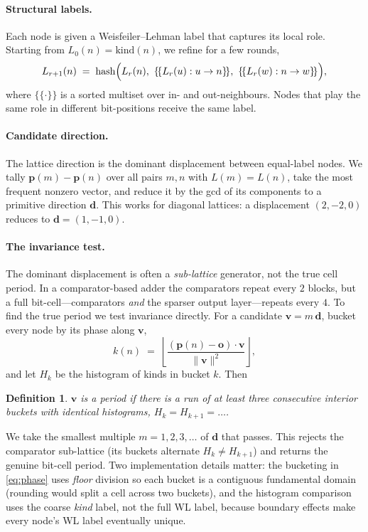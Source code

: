 \documentclass[11pt]{article}
\newtheorem{definition}{Definition}
\newcommand{\vv}{\mathbf{v}}
\newcommand{\pp}{\mathbf{p}}
\newcommand{\oo}{\mathbf{o}}
\begin{document}
\paragraph{Structural labels.} Each node is given a Weisfeiler--Lehman label that
captures its local role. Starting from $L_0(n)=\mathrm{kind}(n)$, we refine for a
few rounds,
\[
L_{r+1}(n) \;=\; \mathrm{hash}\Bigl(L_r(n),\ \{\!\{L_r(u) : u\to n\}\!\},\
\{\!\{L_r(w) : n\to w\}\!\}\Bigr),
\]
where $\{\!\{\cdot\}\!\}$ is a sorted multiset over in- and out-neighbours. Nodes
that play the same role in different bit-positions receive the same label.

\paragraph{Candidate direction.} The lattice direction is the dominant
displacement between equal-label nodes. We tally
$\pp(m)-\pp(n)$ over all pairs $m,n$ with $L(m)=L(n)$, take the most frequent
nonzero vector, and reduce it by the gcd of its components to a primitive
direction $\mathbf{d}$. This works for diagonal lattices: a displacement
$(2,-2,0)$ reduces to $\mathbf{d}=(1,-1,0)$.

\paragraph{The invariance test.} The dominant displacement is often a
\emph{sub-lattice} generator, not the true cell period. In a comparator-based
adder the comparators repeat every $2$ blocks, but a full bit-cell---comparators
\emph{and} the sparser output layer---repeats every $4$. To find the true period
we test invariance directly. For a candidate $\vv=m\,\mathbf{d}$, bucket every
node by its phase along $\vv$,
\begin{equation}\label{eq:phase}
k(n) \;=\; \left\lfloor \frac{(\pp(n)-\oo)\cdot\vv}{\lVert\vv\rVert^2} \right\rfloor,
\end{equation}
and let $H_k$ be the histogram of kinds in bucket $k$. Then
\begin{definition}
$\vv$ is a \emph{period} if there is a run of at least three consecutive interior
buckets with identical histograms, $H_k=H_{k+1}=\dots$.
\end{definition}
We take the smallest multiple $m=1,2,3,\dots$ of $\mathbf{d}$ that passes. This
rejects the comparator sub-lattice (its buckets alternate $H_k\neq H_{k+1}$) and
returns the genuine bit-cell period. Two implementation details matter: the
bucketing in \eqref{eq:phase} uses \emph{floor} division so each bucket is a
contiguous fundamental domain (rounding would split a cell across two buckets),
and the histogram comparison uses the coarse \emph{kind} label, not the full WL
label, because boundary effects make every node's WL label eventually unique.
\end{document}
